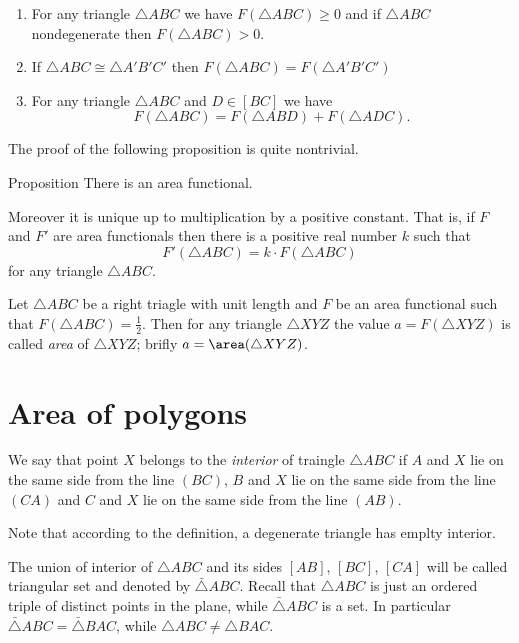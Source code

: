 \begin{enumerate}
\item For any triangle $\triangle ABC$ we have $F(\triangle ABC)\ge 0$ and 
if  $\triangle ABC$ nondegenerate then $F(\triangle ABC)>0$.
\item If $\triangle ABC\cong\triangle A'B'C'$ 
 then $F(\triangle ABC)=F(\triangle A'B'C')$
\item For any triangle $ \triangle ABC$ and $D\in [BC]$ we have
$$F(\triangle ABC)=F(\triangle ABD)+F(\triangle ADC).$$
\end{enumerate}

The proof of the following proposition is quite nontrivial.

\begin{thm}{Proposition}
There is an area functional. 

Moreover it is unique up to multiplication by a positive constant. 
That is, if $F$ and $F'$ are area functionals then there is a positive real number $k$ such that 
\[F'(\triangle ABC)=k\cdot F(\triangle ABC)\]
for any triangle $\triangle ABC$.
\end{thm}

Let $\triangle ABC$ be a right triagle with unit length
and $F$ be an area functional such that $F(\triangle ABC)=\tfrac12$.
Then for any triangle $\triangle XYZ$ the value $a=F(\triangle XYZ)$ is called \emph{area} of $\triangle XYZ$;
brifly $a=\area(\triangle XYZ)$.






\section*{Area of polygons}

We say that point $X$ belongs to the \emph{interior} of traingle $\triangle ABC$
if $A$ and $X$ lie on the same side from the line $(BC)$,
$B$ and $X$ lie on the same side from the line $(CA)$
and 
$C$ and $X$ lie on the same side from the line $(AB)$.

Note that according to the definition,
a degenerate triangle has emplty interior.

The union of interior of $\triangle ABC$ and its sides $[AB]$, $[BC]$, $[CA]$
will be called triangular set and denoted by $\bar\triangle ABC$.
Recall that $\triangle ABC$ is just an ordered triple of distinct points in the plane,
while $\bar\triangle ABC$ is a set.
In particular $\bar\triangle ABC=\bar\triangle BAC$, while $\triangle ABC\ne\triangle BAC$.

